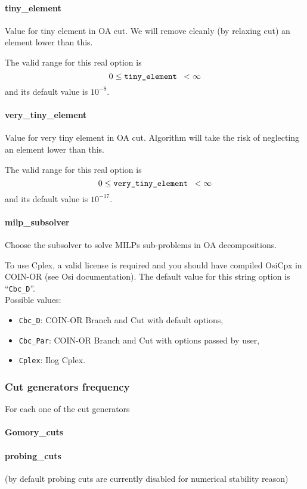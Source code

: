 \paragraph{tiny\_element}
Value for tiny element in OA cut.
We will remove cleanly (by relaxing cut) an element lower
than this.

The  valid range for this real option is
$$0 \le \hbox{\tt tiny\_element } <  \infty$$
and its default value is $10^{-8}$.

\paragraph{very\_tiny\_element}
Value for very tiny element in OA cut.
Algorithm will take the risk of neglecting an element lower
than this.

The  valid range for this real option is
$$0 \le \hbox{\tt very\_tiny\_element } <  \infty$$
and its default value is $10^{-17}$.

\paragraph{milp\_subsolver}
Choose the subsolver to solve MILPs sub-problems in OA decompositions.

  To use Cplex, a valid license is required and
you should have compiled OsiCpx in COIN-OR  (see Osi documentation).
The default value for this string option is ``{\tt Cbc\_D}''.
\\
Possible values:
\begin{itemize}
   \item {\tt Cbc\_D}: COIN-OR Branch and Cut with default options,
   \item {\tt Cbc\_Par}: COIN-OR Branch and Cut with options passed by user,
   \item {\tt Cplex}: Ilog Cplex.
\end{itemize}


\subsubsection{Cut generators frequency}
For each one of the cut generators
\paragraph{Gomory\_cuts}
\paragraph{probing\_cuts}(by default probing cuts are currently disabled for numerical stability reason)
